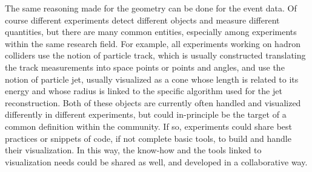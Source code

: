 \documentclass[12pt,a4paper]{article}
\begin{document}
The same reasoning made for the geometry can be done for the event data. Of course different experiments detect different objects
and measure different quantities, but there are many common entities, especially among experiments within the same research field.
For example, all experiments working on hadron colliders use the notion of particle track, which is usually constructed translating
the track measurements into space points or points and angles, and use the notion of particle jet, usually
visualized as a cone whose length is related to its energy and whose radius is linked to the specific algorithm used for the jet
reconstruction. Both of these objects are currently often handled and visualized differently in different experiments, but could in-principle
be the target of a common definition within the community. If so, experiments could share best practices or snippets of code,
if not complete basic tools, to build and handle their visualization. In this way, the know-how and the tools linked to visualization needs
could be shared as well, and developed in a collaborative way.


\end{document}
